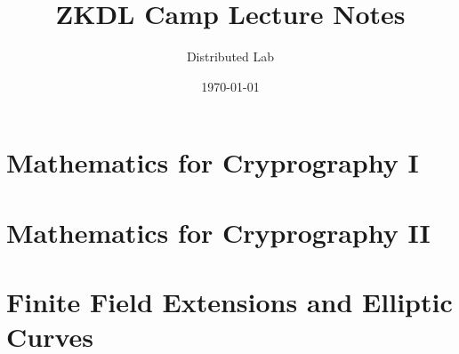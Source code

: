 \documentclass{zkdl-template}
\title{\huge\sffamily\bfseries ZKDL Camp Lecture Notes}
\author{\Large\sffamily Distributed Lab}
\date{\sffamily \today}
\begin{document}
\pagestyle{fancy}

\maketitle

\section{Mathematics for Cryprography I}



\section{Mathematics for Cryprography II}



\section{Finite Field Extensions and Elliptic Curves}


\end{document}

